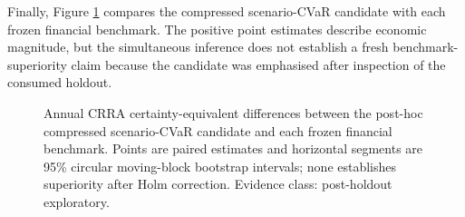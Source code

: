 Finally, Figure \ref{fig:appendix_compressed_reconciliation} compares the
compressed scenario-CVaR candidate with each frozen financial benchmark. The
positive point estimates describe economic magnitude, but the simultaneous
inference does not establish a fresh benchmark-superiority claim because the
candidate was emphasised after inspection of the consumed holdout.

\begin{figure}[!tbp]
\centering

\caption{Annual CRRA certainty-equivalent differences between the post-hoc
compressed scenario-CVaR candidate and each frozen financial benchmark. Points
are paired estimates and horizontal segments are 95\% circular moving-block
bootstrap intervals; none establishes superiority after Holm correction.
Evidence class: post-holdout exploratory.}
\label{fig:appendix_compressed_reconciliation}
\end{figure}
